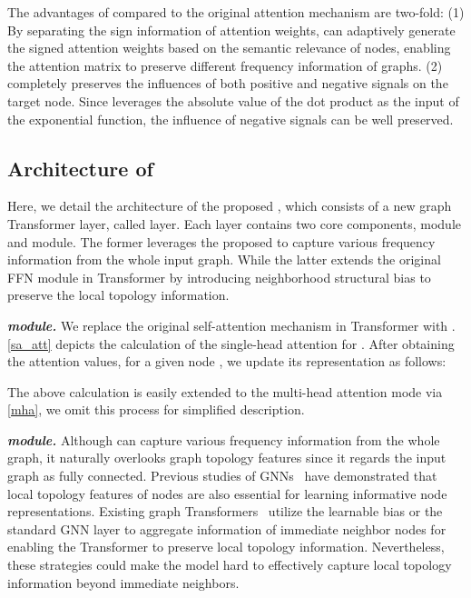 \documentclass[sigconf, screen]{acmart}
\begin{document}
The advantages of \saname compared to the original attention mechanism are two-fold:
(1) By separating the sign information of attention weights, \saname can adaptively generate the signed attention weights based on the semantic relevance of nodes, enabling the attention matrix to preserve different frequency information of graphs. 
(2) \saname completely preserves the influences of both positive and negative signals on the target node.
Since \saname leverages the absolute value of the dot product as the input of the exponential function, the influence of negative signals can be well preserved.

\subsection{Architecture of \name}
Here, we detail the architecture of the proposed \name, which consists of a new graph Transformer layer, called \name layer.
Each \name layer contains two core components, \saname module and \sffn module.
The former leverages the proposed \saname to capture various frequency information from the whole input graph.
While the latter extends the original FFN module in Transformer by introducing neighborhood structural bias to preserve the local topology information.

\textit{\textbf{\saname module.}}
We replace the original self-attention mechanism in Transformer with \saname.
\autoref{sa_att} depicts the calculation of the single-head attention for \saname.
After obtaining the attention values, for a given node , we update its representation  as follows:

The above calculation is easily extended to the multi-head attention mode via \autoref{mha}, we omit this process for simplified description.

\textit{\textbf{\sffn module.}}
Although \saname can capture various frequency information from the whole graph, it naturally overlooks graph topology features since it regards the input graph as fully connected.
Previous studies of GNNs~\cite{fagcn,gprgnn,gcn,gdc} have  demonstrated that local topology features of nodes are also essential for learning informative node representations. 
Existing graph Transformers~\cite{nodeformer,gps,sat} utilize the learnable bias or the standard GNN layer to aggregate information of immediate neighbor nodes for enabling the Transformer to preserve local topology information.
Nevertheless, these strategies could make the model hard to effectively capture local topology information beyond immediate neighbors.
\end{document}

